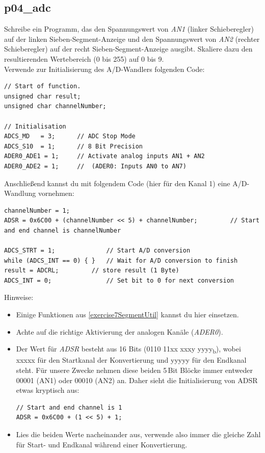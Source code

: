 \subsection{p04\_adc}
Schreibe ein Programm, das den Spannungswert von \emph{AN1} (linker Schieberegler) auf der linken Sieben-Segment-Anzeige und den Spannungswert von \emph{AN2} (rechter Schieberegler) auf der recht Sieben-Segment-Anzeige ausgibt.
Skaliere dazu den resultierenden Wertebereich (0 bis 255) auf 0 bis 9.\\

Verwende zur Initialisierung des A/D-Wandlers folgenden Code:
\begin{lstlisting}
// Start of function.
unsigned char result;
unsigned char channelNumber;

// Initialisation
ADCS_MD   = 3;		// ADC Stop Mode
ADCS_S10  = 1;		// 8 Bit Precision
ADER0_ADE1 = 1;	    // Activate analog inputs AN1 + AN2
ADER0_ADE2 = 1;     //  (ADER0: Inputs AN0 to AN7)
\end{lstlisting}
Anschließend kannst du mit folgendem Code (hier für den Kanal 1) eine A/D-Wandlung vornehmen:
\begin{lstlisting}
channelNumber = 1;
ADSR = 0x6C00 + (channelNumber << 5) + channelNumber;	      // Start and end channel is channelNumber

ADCS_STRT = 1;				// Start A/D conversion
while (ADCS_INT == 0) { }	// Wait for A/D conversion to finish
result = ADCRL;			// store result (1 Byte)
ADCS_INT = 0;				// Set bit to 0 for next conversion
\end{lstlisting}

Hinweise:
\begin{itemize}
\item 
Einige Funktionen aus \ref{exercise7SegmentUtil} kannst du hier einsetzen.

\item 
Achte auf die richtige Aktivierung der analogen Kanäle (\textit{ADER0}).

\item Der Wert für \textit{ADSR} besteht aus 16 Bits (0110 11xx xxxy yyyy\textsubscript{b}), wobei xxxxx für den Startkanal der Konvertierung und yyyyy für den Endkanal steht. Für unsere Zwecke nehmen diese beiden 5\,Bit Blöcke immer entweder 00001 (AN1) oder 00010 (AN2) an.
Daher sieht die Initialisierung von ADSR etwas kryptisch aus:
\begin{verbatim}
// Start and end channel is 1
ADSR = 0x6C00 + (1 << 5) + 1;
\end{verbatim}

\item
Lies die beiden Werte nacheinander aus, verwende also immer die gleiche Zahl für Start- und Endkanal während einer Konvertierung.

\end{itemize}

